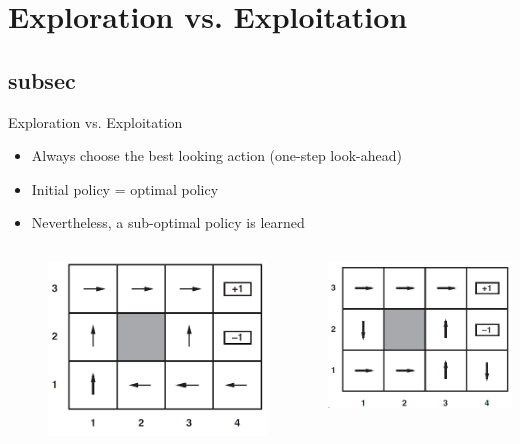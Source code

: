 \section{Exploration vs. Exploitation}
\subsection{subsec} %

\begin{frame}[c]{Exploration vs. Exploitation}
\begin{itemize}
	\item Always choose the best looking action (one-step look-ahead)
	\item Initial policy = optimal policy
	\item Nevertheless, a sub-optimal policy is learned
\end{itemize}
	\begin{columns}[c]
			\begin{figure}
				\includegraphics[width=0.9\linewidth]{img-elias/optimal_policy.png}
			\end{figure}
		\begin{center}
			\includegraphics[width=0.9\linewidth]{img-elias/learned_policy.png}

\end{center}
\end{columns}
\end{frame}
